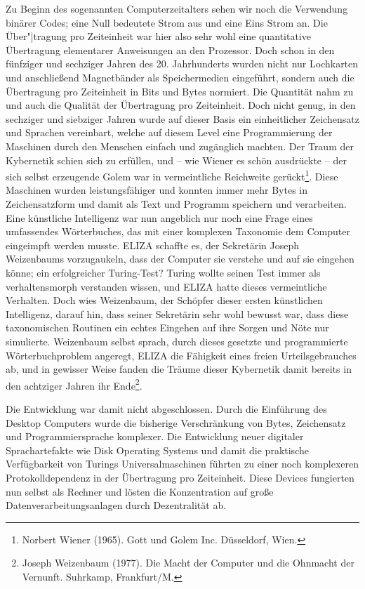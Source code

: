 \documentclass[a4paper,11pt]{article}
\begin{document}
Zu Beginn des sogenannten Computerzeitalters sehen wir noch die Verwendung
binärer Codes; eine Null bedeutete Strom aus und eine Eins Strom an. Die
Über"|tragung pro Zeiteinheit war hier also sehr wohl eine quantitative
Übertragung elementarer Anweisungen an den Prozessor. Doch schon in den
fünfziger und sechziger Jahren des 20. Jahrhunderts wurden nicht nur
Lochkarten und anschließend Magnetbänder als Speichermedien eingeführt,
sondern auch die Übertragung pro Zeiteinheit in Bits und Bytes normiert. Die
Quantität nahm zu und auch die Qualität der Übertragung pro Zeiteinheit. Doch
nicht genug, in den sechziger und siebziger Jahren wurde auf dieser Basis ein
einheitlicher Zeichensatz und Sprachen vereinbart, welche auf diesem Level
eine Programmierung der Maschinen durch den Menschen einfach und zugänglich
machten. Der Traum der Kybernetik schien sich zu erfüllen, und -- wie Wiener
es schön ausdrückte -- der sich selbst erzeugende Golem war in vermeintliche
Reichweite gerückt\footnote{Norbert Wiener (1965). Gott und Golem Inc.
  Düsseldorf, Wien.}. Diese Maschinen wurden leistungsfähiger und konnten
immer mehr Bytes in Zeichensatzform und damit als Text und Programm speichern
und verarbeiten. Eine künstliche Intelligenz war nun angeblich nur noch eine
Frage eines umfassendes Wörterbuches, das mit einer komplexen Taxonomie dem
Computer eingeimpft werden musste. ELIZA schaffte es, der Sekretärin Joseph
Weizenbaums vorzugaukeln, dass der Computer sie verstehe und auf sie eingehen
könne; ein erfolgreicher Turing-Test? Turing wollte seinen Test immer als
verhaltensmorph verstanden wissen, und ELIZA hatte dieses vermeintliche
Verhalten. Doch wies Weizenbaum, der Schöpfer dieser ersten künstlichen
Intelligenz, darauf hin, dass seiner Sekretärin sehr wohl bewusst war, dass
diese taxonomischen Routinen ein echtes Eingehen auf ihre Sorgen und Nöte nur
simulierte.
\newpage
Weizenbaum selbst sprach, durch dieses gesetzte und programmierte
Wörterbuchproblem angeregt, ELIZA die Fähigkeit eines freien Urteilsgebrauches
ab, und in gewisser Weise fanden die Träume dieser Kybernetik damit bereits in
den achtziger Jahren ihr Ende\footnote{Joseph Weizenbaum (1977). Die Macht der
  Computer und die Ohnmacht der Vernunft. Suhrkamp, Frankfurt/M. }.

Die Entwicklung war damit nicht abgeschlossen. Durch die Einführung des
Desktop Computers wurde die bisherige Verschränkung von Bytes, Zeichensatz und
Programmiersprache komplexer. Die Entwicklung neuer digitaler Sprachartefakte
wie Disk Operating Systems und damit die praktische Verfügbarkeit von Turings
Universalmaschinen führten zu einer noch komplexeren Protokolldependenz in der
Übertragung pro Zeiteinheit. Diese Devices fungierten nun selbst als Rechner
und lösten die Konzentration auf große Datenverarbeitungsanlagen durch
Dezentralität ab.
\end{document}
